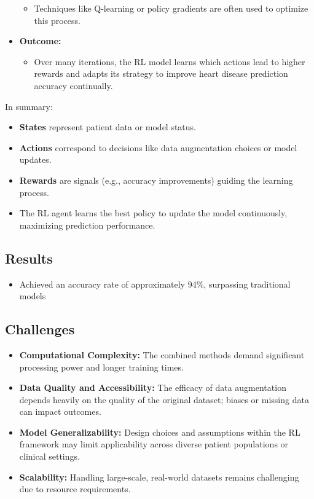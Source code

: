 \begin{itemize}
\begin{itemize}
            \item Techniques like Q-learning or policy gradients are often used to optimize this process.
        \end{itemize}
    \item \textbf{Outcome:}
        \begin{itemize}
            \item Over many iterations, the RL model learns which actions lead to higher rewards and adapts its strategy to improve heart disease prediction accuracy continually.
        \end{itemize}
\end{itemize}

\noindent In summary:
\begin{itemize}
    \item \textbf{States} represent patient data or model status.
    \item \textbf{Actions} correspond to decisions like data augmentation choices or model updates.
    \item \textbf{Rewards} are signals (e.g., accuracy improvements) guiding the learning process.
    \item The RL agent learns the best policy to update the model continuously, maximizing prediction performance.
\end{itemize}

\subsection*{Results}
\begin{itemize}
    \item Achieved an accuracy rate of approximately 94\%, surpassing traditional models
\end{itemize}

\subsection*{Challenges}
\begin{itemize}
    \item \textbf{Computational Complexity:} The combined methods demand significant processing power and longer training times.
    \item \textbf{Data Quality and Accessibility:} The efficacy of data augmentation depends heavily on the quality of the original dataset; biases or missing data can impact outcomes.
    \item \textbf{Model Generalizability:} Design choices and assumptions within the RL framework may limit applicability across diverse patient populations or clinical settings.
    \item \textbf{Scalability:} Handling large-scale, real-world datasets remains challenging due to resource requirements.
\end{itemize}

